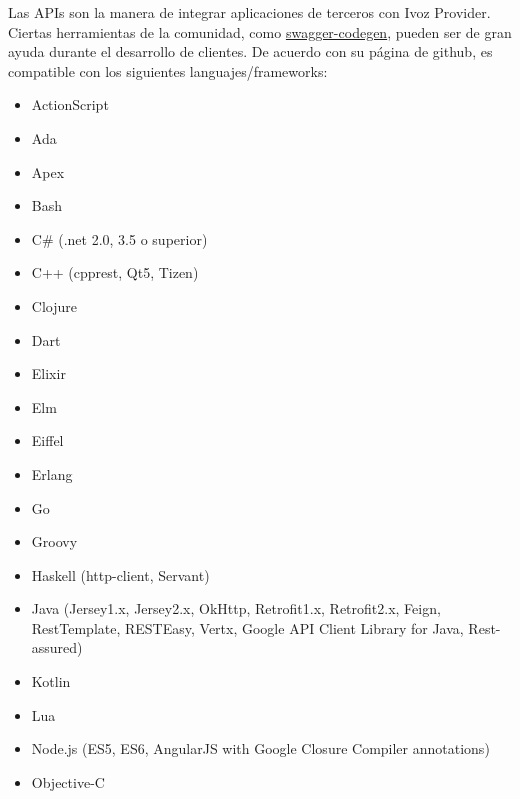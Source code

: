 \documentclass[letterpaper,10pt,spanish]{sphinxmanual}
\begin{document}
Las APIs son la manera de integrar aplicaciones de terceros con Ivoz Provider. Ciertas herramientas de la comunidad, como \href{https://github.com/swagger-api/swagger-codegen}{swagger-codegen}, pueden ser de gran ayuda durante el desarrollo de clientes. De acuerdo con su página de github, es compatible con los siguientes languajes/frameworks:
\begin{itemize}
\item {} 
ActionScript

\item {} 
Ada

\item {} 
Apex

\item {} 
Bash

\item {} 
C\# (.net 2.0, 3.5 o superior)

\item {} 
C++ (cpprest, Qt5, Tizen)

\item {} 
Clojure

\item {} 
Dart

\item {} 
Elixir

\item {} 
Elm

\item {} 
Eiffel

\item {} 
Erlang

\item {} 
Go

\item {} 
Groovy

\item {} 
Haskell (http-client, Servant)

\item {} 
Java (Jersey1.x, Jersey2.x, OkHttp, Retrofit1.x, Retrofit2.x, Feign, RestTemplate, RESTEasy, Vertx, Google API Client Library for Java, Rest-assured)

\item {} 
Kotlin

\item {} 
Lua

\item {} 
Node.js (ES5, ES6, AngularJS with Google Closure Compiler annotations)

\item {} 
Objective-C


\end{itemize}
\end{document}
